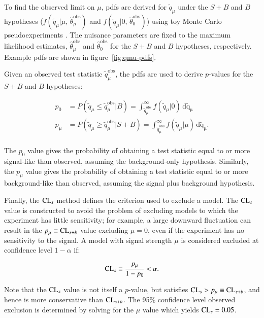 \begin{appendices}
To find the observed limit on $\mu$, pdfs are derived for $\tilde{q}_{\mu}$ under the $S+B$ and $B$ hypotheses ($f(\tilde{q}_{\mu}|\mu,\,\hat{\theta}_{\mu}^{\mathrm{obs}})$ and $f(\tilde{q}_{\mu}|0,\,\hat{\theta}_{0}^{\mathrm{obs}})$) using toy Monte Carlo pseudoexperiments
. The nuisance parameters are fixed to the maximum likelihood estimates, $\hat{\theta}_{\mu}^{\mathrm{obs}}$ and $\hat{\theta}_{0}^{\mathrm{obs}}$ for the $S+B$ and $B$ hypotheses, respectively. Example pdfs are shown in figure~\ref{fig:qmu-pdfs}. 

Given an observed test statistic $\tilde{q}_{\mu}^{\mathrm{obs}}$, the pdfs are used to derive $p$-values for the $S+B$ and $B$ hypotheses:

\begin{align}\label{eqn:p-values}
	p_0 &= P(\tilde{q}_{\mu}\leq \tilde{q}_{\mu}^{\mathrm{obs}}|B)=  \int_{\tilde{q}_{\mu}^{\mathrm{obs}}}^{\infty} f(\tilde{q}_{\mu}|0)\,\mathrm{d\tilde{q}_{\mu}} \\
	p_{\mu} &= P(\tilde{q}_{\mu}\geq \tilde{q}_{\mu}^{\mathrm{obs}}|S+B) = \int_{\tilde{q}_{\mu}^{\mathrm{obs}}}^{\infty} f(\tilde{q}_{\mu}|\mu)\,\mathrm{d\tilde{q}_{\mu}}. \\
\end{align}

The $p_0$ value gives the probability of obtaining a test statistic equal to or more signal-like than observed, assuming the background-only hypothesis. Similarly, the $p_{\mu}$ value gives the probability of obtaining a test statistic equal to or more background-like than observed, assuming the signal plus background hypothesis. 

Finally, the $\mathrm{CL}_s$ method defines the criterion used to exclude a model. The $\mathrm{CL}_s$ value is constructed to avoid the problem of excluding models to which the experiment has little sensitivity; for example, a large downward fluctuation can result in the $p_{\mu}\equiv \mathrm{CL}_{s+b}$ value excluding $\mu=0$, even if the experiment has no sensitivity to the signal. A model with signal strength $\mu$ is considered excluded at confidence level $1-\alpha$ if:

\begin{equation}\label{eqn:cls}
	\mathrm{CL}_s \equiv \frac{p_{\mu}}{1-p_0} < \alpha.
\end{equation}

Note that the $\mathrm{CL}_s$ value is not itself a $p$-value, but satisfies $\mathrm{CL}_s > p_{\mu}\equiv \mathrm{CL}_{s+b}$, and hence is more conservative than $\mathrm{CL}_{s+b}$. The 95\% confidence level observed exclusion is determined by solving for the $\mu$ value which yields $\mathrm{CL}_s=0.05$.





\end{appendices}

